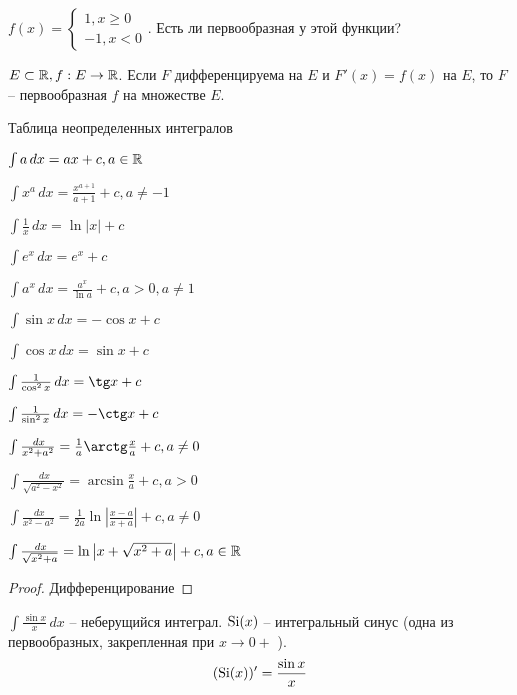 \begin{Ex}
	$f(x) = \begin{cases}
		1, x \geqslant 0 \\
		-1, x < 0
	\end{cases}$. Есть ли первообразная у этой функции?
\end{Ex}

\begin{Def}
	$E \subset \mathbb{R}, f : E \to \mathbb{R}$. Если $F$ дифференцируема на $E$ и $F'(x) = f(x)$ на $E$, то $F$ -- первообразная $f$ на множестве $E$.
\end{Def}

Таблица неопределенных интегралов

\begin{multicols}{2}
	\begin{MyList}
		\item $\int a \,dx = ax + c, a \in \mathbb{R}$ 
		\item $\int x^a \,dx = \frac{x^{a + 1}}{a + 1} + c, a \neq -1$ 
		\item $\int \frac{1}{x}\,dx = \ln |x| + c$ 
		\item $\int e^x \,dx = e^x + c$ 
		\item $\int a^x \,dx = \frac{a^x}{\ln a} + c, a > 0, a \neq 1$ 
		\item $\int \sin x \,dx = -\cos x + c$
		\item $\int \cos x \,dx = \sin x + c$ 
		\item $\int \frac{1}{\cos^2 x}\,dx = \tg x + c$ 
		\item $\int \frac{1}{\sin^2 x}\,dx = -\ctg x + c$ 
		\item $\int \frac{\,dx}{x^2 + a^2} = \frac{1}{a} \arctg \frac{x}{a} + c, a \neq 0$
		\item $\int \frac{\,dx}{\sqrt{a^2 - x^2}} = \arcsin \frac{x}{a} + c, a > 0$
		\item $\int \frac{\,dx}{x^2 - a^2} = \frac{1}{2a}\ln \left| \frac{x - a}{x + a}\right| + c, a \neq 0$ 
		\item $\int \frac{\,dx}{\sqrt{x^2 + a}} = \ln \left| x + \sqrt{x^2 + a}\right| + c, a \in \mathbb{R}$   
	\end{MyList}	
\end{multicols}

\begin{proof}
	Дифференцирование
\end{proof}

\begin{Example}
	$\int \frac{\sin x}{x} \,dx$ -- неберущийся интеграл.
	$\operatorname{Si}(x)$ -- интегральный синус (одна из первообразных, закрепленная при $x \to 0+$ ).
	\[(\operatorname{Si}(x))' = \frac{\sin x}{x}\]
\end{Example}

